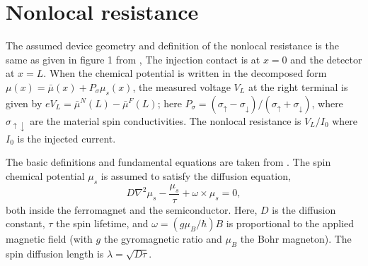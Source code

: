 \section{Nonlocal resistance}

The assumed device geometry and definition of the nonlocal resistance
is the same as given in figure 1 from \cite{PhysRevB.67.052409},
The injection contact is at $x = 0$ and the detector at $x = L$.
When the chemical potential is written in the decomposed form
$μ(x) = \bar{μ} (x) + P_σ μ_s(x)$,
the measured voltage $V_L$ at the right terminal is given by
$e V_L = \bar{μ}^N (L) - \bar{μ}^F (L)$;
here $P_σ = \left( σ_↑ - σ_↓ \right) / \left( σ_↑ + σ_↓ \right)$,
where $σ_{↑↓}$ are the material spin conductivities.
The nonlocal resistance is $V_L / I_0$ where $I_0$ is the injected current.

The basic definitions and fundamental equations are taken from
\cite{ActaPhysicaSlovaca.57.4_5.565-907}.
The spin chemical potential $μ_s$ is assumed to satisfy the diffusion equation,
\begin{equation}
  \label{eq:diffusion}
  D ∇^2 μ_s - \frac{μ_s}{τ} + ω × μ_s = 0 ,
\end{equation}
both inside the ferromagnet and the semiconductor.
Here, $D$ is the diffusion constant, $τ$ the spin lifetime,
and $ω = \left( g μ_B / ℏ \right) B$ is proportional to the applied magnetic field
(with $g$ the gyromagnetic ratio and $μ_B$ the Bohr magneton).
The spin diffusion length is $λ = \sqrt{D τ}$.


